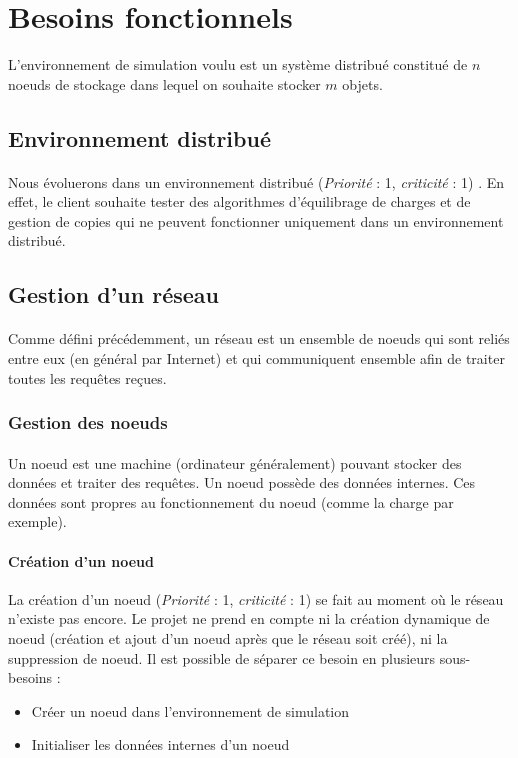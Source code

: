 \documentclass[12pt]{article}
\newcommand{\besoin}[2] {
  (\textit{Priorité} : #1, \textit{criticité} : #2)
}
\begin{document}
\newpage
\section{Besoins fonctionnels}

L'environnement de simulation voulu est un système distribué constitué de $n$ noeuds de stockage dans lequel on souhaite stocker $m$ objets.

\subsection{Environnement distribué}

\paragraph{} Nous évoluerons dans un environnement distribué \besoin{1}{1}.
En effet, le client souhaite tester des algorithmes d'équilibrage de charges et de gestion de copies qui ne peuvent fonctionner uniquement dans un environnement distribué.

\subsection{Gestion d'un réseau}

\paragraph{} Comme défini précédemment, un réseau est un ensemble de noeuds qui sont reliés entre eux (en général par Internet) et qui communiquent ensemble afin de traiter toutes les requêtes reçues.

\subsubsection{Gestion des noeuds}

\paragraph{} Un noeud est une machine (ordinateur généralement) pouvant stocker des données et traiter des requêtes. Un noeud possède des données internes. Ces données sont propres au fonctionnement du noeud (comme la charge par exemple).

\paragraph{Création d'un noeud} La création d'un noeud \besoin{1}{1} se fait au moment où le réseau n'existe pas encore. 
Le projet ne prend en compte ni la création dynamique de noeud (création et ajout d'un noeud après que le réseau soit créé), ni la suppression de noeud. 
Il est possible de séparer ce besoin en plusieurs sous-besoins :
 \begin{itemize}
 	\item Créer un noeud dans l'environnement de simulation
 	\item Initialiser les données internes d'un noeud \vspace{0.2cm}
 \end{itemize}
 
\end{document}
